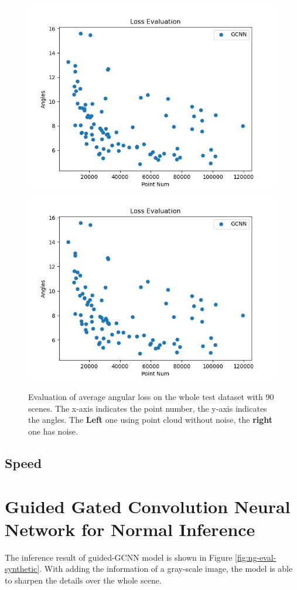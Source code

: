 \begin{figure}[h!]
	\centering
	\includegraphics[width=.4\textwidth]{./Figures/scatter-gcnn-no-noise.png}
	\includegraphics[width=.4\textwidth]{./Figures/scatter-gcnn-noised.png}
	\caption{Evaluation of average angular loss on the whole test dataset with 90 scenes. The x-axis indicates the point number, the y-axis indicates the angles. The \textbf{Left} one using point cloud without noise, the \textbf{right} one has noise.}
	\label{fig:scatter-gcnn}
\end{figure}




\subsection{Speed}


\section{Guided Gated Convolution Neural Network for Normal Inference }

The inference result of guided-GCNN model is shown in Figure \ref{fig:ng-eval-synthetic}. With adding the information of a gray-scale image, the model is able to sharpen the details over the whole scene. 

